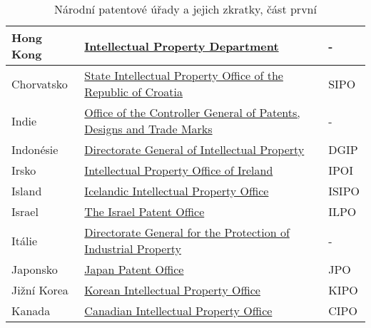 \begin{table}[h!]
\begin{tabular}{|>{\centering\arraybackslash}p{2.2cm}|>{\centering\arraybackslash}p{8cm}|>{\centering\arraybackslash}p{2cm}|}
	\hline
	Hong Kong & \href{https://www.ipd.gov.hk/index.htm}{Intellectual Property Department}  & -         \\ 
	\hline
	Chorvatsko & \href{https://www.dziv.hr/}{State Intellectual Property Office of the Republic of Croatia}  & SIPO         \\ 
	\hline
	Indie & \href{http://www.ipindia.nic.in/}{Office of the Controller General of Patents, Designs and Trade Marks}  & -         \\ 
	\hline
	Indonésie & \href{http://www.dgip.go.id/}{Directorate General of Intellectual Property}  & DGIP         \\ 
	\hline
	Irsko & \href{https://www.ipoi.gov.ie/en/}{Intellectual Property Office of Ireland}  & IPOI         \\ 
	\hline
	Island & \href{https://www.isipo.is/}{Icelandic Intellectual Property Office}  & ISIPO         \\ 
	\hline
	Israel & \href{https://www.gov.il/en/departments/ilpo}{The Israel Patent Office}  & ILPO         \\ 
	\hline
	Itálie & \href{https://uibm.mise.gov.it/index.php/it/}{Directorate General for the Protection of Industrial Property}  & -         \\ 
	\hline
	Japonsko & \href{https://www.jpo.go.jp/e/index.html}{Japan Patent Office}  & JPO         \\ 
	\hline
	Jižní Korea & \href{http://www.kipo.go.kr/}{Korean Intellectual Property Office}  & KIPO         \\ 
	\hline	
	Kanada & \href{https://www.ic.gc.ca/}{Canadian Intellectual Property Office}  & CIPO         \\ 
	\hline
	\end{tabular}
	\caption{Národní patentové úřady a jejich zkratky, část první}
	\label{tab:table_offices1}
	\end{table}

\newpage

